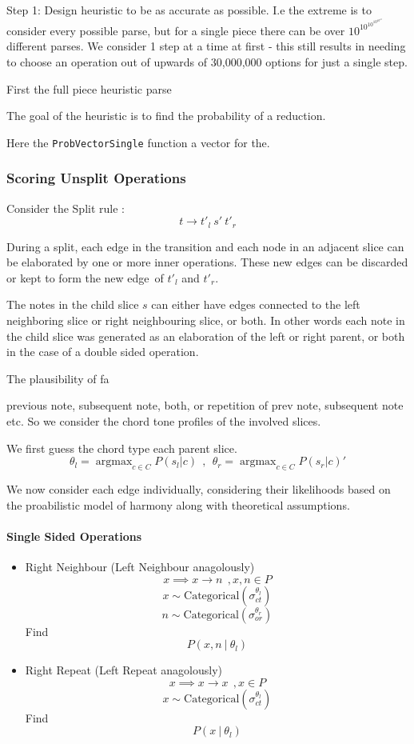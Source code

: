 \documentclass[12pt,a4paper,twoside,openright]{report}
\theoremstyle{definition}
\begin{document}
Step 1: Design heuristic to be as accurate as possible. I.e the extreme is to consider every possible parse, but for a single piece there can be over $10^{10^{10^{10^{10^{10}}}}}$ different parses. We consider 1 step at a time at first - this still results in needing to choose an operation out of upwards of 30,000,000 options for just a single step.     
\par
First the full piece heuristic parse 
\par
The goal of the heuristic is to find the probability of a reduction. 


Here the \texttt{ProbVectorSingle} function a vector for the.

\FloatBarrier
\subsubsection{Scoring Unsplit Operations}
Consider the Split rule : \[t \to t'_{l}~s'~t'_{r}\]
\par
During a split, each edge in the transition and each node in an adjacent slice can be elaborated by one or more inner operations.
These new edges can be discarded or kept to form the new edge of $t'_l$ and $t'_r$.
\par 
The notes in the child slice $s$ can either have edges connected to the left neighboring slice or right neighbouring slice, or both.
In other words each note in the child slice was generated as an elaboration of the left or right parent, or both in the case of a double sided operation. 

The plausibility of fa

previous note, subsequent note, both, or repetition of prev note, subsequent note etc. So we consider the chord tone profiles of the involved slices. 

We first guess the chord type each parent slice. 
\[\theta_l = \mathop{argmax}_{c \in C} P(s_l|c) ~~,~~ \theta_r = \mathop{argmax}_{c \in C} P(s_r|c) '\]

We now consider each edge individually, considering their likelihoods based on the proabilistic model of harmony along with theoretical assumptions. 

\paragraph{Single Sided Operations} 
\begin{itemize}
  \item Right Neighbour (Left Neighbour anagolously)
    \[ x \implies x \to n~~, x,n \in P \]
    \[x \sim \text{Categorical}(\sigma_{ct}^{\theta_l})\]
    \[n \sim \text{Categorical}(\sigma_{or}^{\theta_r})\]
    Find \[P(x,n~|~\theta_l)\]
  \item Right Repeat (Left Repeat anagolously)
    \[ x \implies x \to x~~, x \in P \]
    \[x \sim \text{Categorical}(\sigma_{ct}^{\theta_l})\]
    Find \[P(x~|~\theta_l)\]
\end{itemize}
\end{document}

